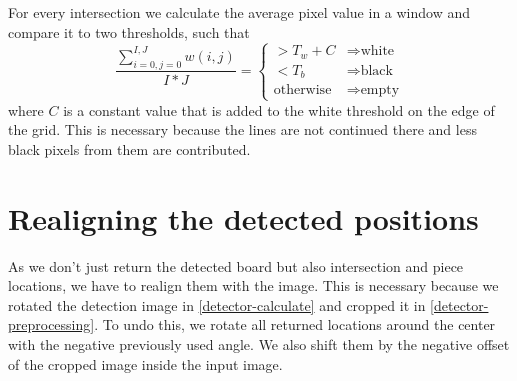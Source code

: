 	For every intersection we calculate the average pixel value in a window and compare it to two thresholds, such that \begin{equation}
		\frac{\sum^{I,J}_{i=0,j=0}w(i,j)}{I*J} =
		\begin{cases}
		> T_{w} + C & \Rightarrow  \text{white}\\
		< T_{b} & \Rightarrow \text{black}\\
		\text{otherwise} & \Rightarrow \text{empty}
		\end{cases}
	\end{equation}
	where $C$ is a constant value that is added to the white threshold on the edge of the grid. This is necessary because the lines are not continued there and less black pixels from them are contributed.\

	\section{Realigning the detected positions}
	As we don't just return the detected board but also intersection and piece locations, we have to realign them with the image. This is necessary because we rotated the detection image in \ref{detector-calculate} and cropped it in \ref{detector-preprocessing}. To undo this, we rotate all returned locations around the center with the negative previously used angle. We also shift them by the negative offset of the cropped image inside the input image.